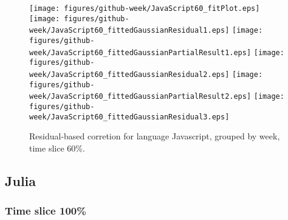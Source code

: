 \begin{figure}[hb]
\centering
{}
{\texttt{[image: figures/github-week/JavaScript60\_fitPlot.eps]}}
{\texttt{[image: figures/github-week/JavaScript60\_fittedGaussianResidual1.eps]}}
{\texttt{[image: figures/github-week/JavaScript60\_fittedGaussianPartialResult1.eps]}}
{\texttt{[image: figures/github-week/JavaScript60\_fittedGaussianResidual2.eps]}}
{\texttt{[image: figures/github-week/JavaScript60\_fittedGaussianPartialResult2.eps]}}
{\texttt{[image: figures/github-week/JavaScript60\_fittedGaussianResidual3.eps]}}
\caption{Residual-based corretion for language Javascript, grouped by week, time slice 60\%.}
\end{figure}


\clearpage 
\newpage 


\subsection{Julia}

\FloatBarrier

\subsubsection{Time slice 100\%}

